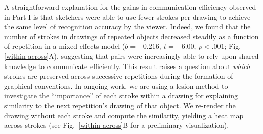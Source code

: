 \documentclass[10pt,letterpaper]{article}
\newcommand{\jefan}[1]{\textcolor{Blue}{jefan: #1}}
\begin{document}
A straightforward explanation for the gains in communication efficiency observed in Part I is that sketchers were able to use fewer strokes per drawing to achieve the same level of recognition accuracy by the viewer.
Indeed, we found that the number of strokes in drawings of repeated objects decreased steadily as a function of repetition in a mixed-effects model ($b = -0.216, ~t = -6.00, ~p < .001$; Fig. \ref{within-across}A), %
suggesting that pairs were increasingly able to rely upon shared knowledge to communicate efficiently.
This result raises a question about \emph{which} strokes are preserved across successive repetitions during the formation of graphical conventions.
In ongoing work, we are using a lesion method to investigate the ``importance'' of each stroke within a drawing for explaining similarity to the next repetition's drawing of that object.
We re-render the drawing without each stroke and compute the similarity, yielding a heat map across strokes (see Fig.~\ref{within-across}B for a preliminary visualization).





\end{document}
